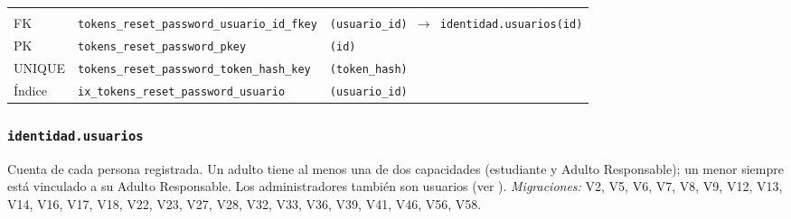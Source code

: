 {\small
\begin{xltabular}{\textwidth}{@{}>{\raggedright\arraybackslash}p{1.7cm} >{\raggedright\arraybackslash}p{4.6cm} L@{}}
    \toprule
     &  &  \\
    \midrule
    \endfirsthead
    \toprule
     &  &  \\
    \midrule
    \endhead
    \bottomrule
    \endfoot
    FK & \texttt{tokens\_\allowbreak{}reset\_\allowbreak{}password\_\allowbreak{}usuario\_\allowbreak{}id\_\allowbreak{}fkey} & \texttt{(\allowbreak{}usuario\_\allowbreak{}id) $\rightarrow$ identidad.usuarios(\allowbreak{}id)} \\
    PK & \texttt{tokens\_\allowbreak{}reset\_\allowbreak{}password\_\allowbreak{}pkey} & \texttt{(\allowbreak{}id)} \\
    UNIQUE & \texttt{tokens\_\allowbreak{}reset\_\allowbreak{}password\_\allowbreak{}token\_\allowbreak{}hash\_\allowbreak{}key} & \texttt{(\allowbreak{}token\_\allowbreak{}hash)} \\
    Índice & \texttt{ix\_\allowbreak{}tokens\_\allowbreak{}reset\_\allowbreak{}password\_\allowbreak{}usuario} & \texttt{(\allowbreak{}usuario\_\allowbreak{}id)} \\
\end{xltabular}
}

\subsubsection{\texorpdfstring{\texttt{identidad.usuarios}}{identidad.usuarios}}\label{dd:identidad.usuarios}

Cuenta de cada persona registrada. Un adulto tiene al menos una de dos capacidades (estudiante y Adulto Responsable); un menor siempre está vinculado a su Adulto Responsable. Los administradores también son usuarios (ver ). \emph{Migraciones:} V2, V5, V6, V7, V8, V9, V12, V13, V14, V16, V17, V18, V22, V23, V27, V28, V32, V33, V36, V39, V41, V46, V56, V58.

